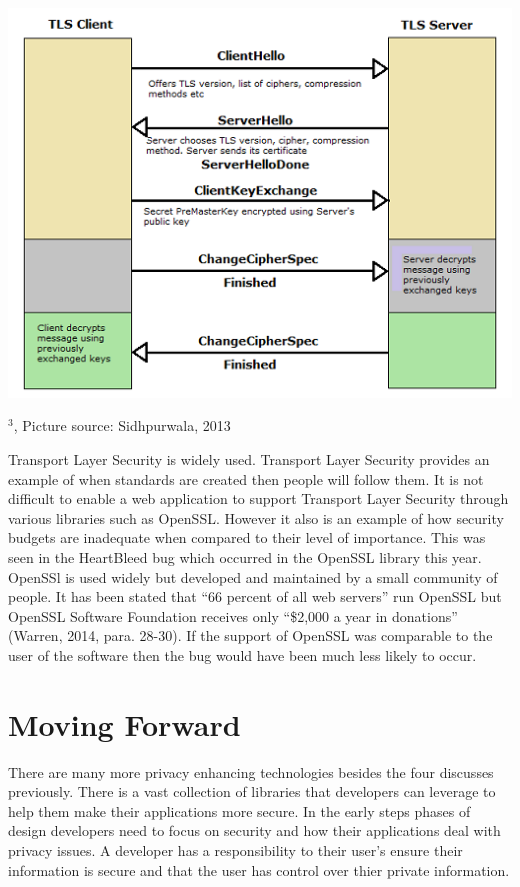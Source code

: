 \documentclass[12pt]{article}
\def\inst#1{$^{#1}$}
\begin{document}
\includegraphics{tls-handshake}
 \begin{center}
{\footnotesize
\inst{3}, Picture source: Sidhpurwala, 2013}
\end{center}

 Transport Layer Security is widely used. Transport Layer Security provides an example of when standards are created then people will follow them. It is not difficult to enable a web application to support Transport Layer Security through various libraries such as OpenSSL. However it also is an example of how security budgets are inadequate when compared to their level of importance. This was seen in the HeartBleed bug which occurred in the OpenSSL library this year. OpenSSl is used widely but developed and maintained by a small community of people. It has been stated that ``66 percent of all web servers'' run OpenSSL but OpenSSL Software Foundation receives only ``\$2,000 a year in donations'' (Warren, 2014, para. 28-30). If the support of OpenSSL was comparable to the user of the software then the bug would have been much less likely to occur.

\section{Moving Forward}\label{sec:moving-forward}
There are many more privacy enhancing technologies besides the four discusses previously. There is a vast collection of libraries that developers can leverage to help them make their applications more secure. In the early steps phases of design developers need to focus on security and how their applications deal with privacy issues. A developer has a responsibility to their user's ensure their information is secure and that the user has control over thier private information. 
\end{document}
